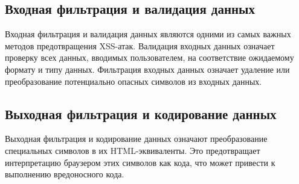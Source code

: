 \documentclass[a4paper,12pt]{diplom}
\begin{document}
	 \subsection{Входная фильтрация и валидация данных}
	 
	 Входная фильтрация и валидация данных являются одними из самых важных методов предотвращения XSS-атак. Валидация входных данных означает проверку всех данных, вводимых пользователем, на соответствие ожидаемому формату и типу данных. Фильтрация входных данных означает удаление или преобразование потенциально опасных символов из входных данных.
	 
	 \subsection{Выходная фильтрация и кодирование данных}
	 
	 Выходная фильтрация и кодирование данных означают преобразование специальных символов в их HTML-эквиваленты. Это предотвращает интерпретацию браузером этих символов как кода, что может привести к выполнению вредоносного кода. 
	 
	 
	 
	 
	 
	 		
	 
	 
	 
	 
	 
	 
	 
	 
	 
	 
	 
	 
	 
	 
	 
	 
	 
	 
	 
	
	
	
	
	
	
	
	
	
	
	
	
	
	
	
	\renewcommand\bibname{Список литературы}
	
	
	
	
	
\end{document}
